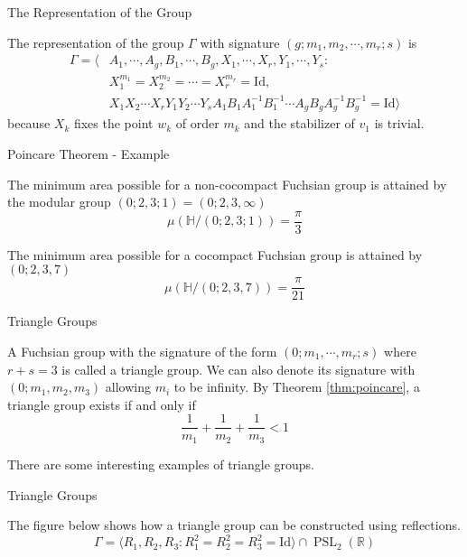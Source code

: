 \documentclass[
	american,
	sections numbered,
	usenames,
	xcolor=dvipsnames,
	aspectratio=169,
]{beamer}
\renewcommand{\H}{\mathbb{H}}
\DeclareMathOperator{\PSL}{PSL}
\theoremstyle{plain}%
\begin{document}
\begin{frame}{The Representation of the Group}

	The representation of the group $\Gamma$ with signature $(g;m_1,m_2,\cdots,m_r;s)$ is 
    \begin{align*}
    \Gamma=\langle &A_1,\cdots,A_g,B_1,\cdots,B_g,X_1,\cdots,X_r,Y_1,\cdots,Y_s:\\
    &X_1^{m_1}=X_2^{m_2}=\cdots=X_r^{m_r}=\text{Id},\\
    &X_1X_2\cdots X_rY_1Y_2\cdots Y_sA_1B_1A_1^{-1}B_1^{-1}\cdots A_gB_gA_g^{-1}B_g^{-1}=\text{Id}\rangle
    \end{align*}
    because $X_k$ fixes the point $w_k$ of order $m_k$ and the stabilizer of $v_1$ is trivial.

\end{frame}

\begin{frame}{Poincare Theorem - Example}

	The minimum area possible for a non-cocompact Fuchsian group is attained by the modular group $(0;2,3;1)=(0;2,3,\infty)$
    $$\mu(\H/(0;2,3;1))=\frac{\pi}{3}$$

    The minimum area possible for a cocompact Fuchsian group is attained by $(0;2,3,7)$
    $$\mu(\H/(0;2,3,7))=\frac{\pi}{21}$$

\end{frame}

\begin{frame}{Triangle Groups}

	A Fuchsian group with the signature of the form $(0;m_1,\cdots,m_r;s)$ where $r+s=3$ is called a triangle group. We can also denote its signature with $(0;m_1,m_2,m_3)$ allowing $m_i$ to be infinity. By Theorem \ref{thm:poincare}, a triangle group exists if and only if $$\frac{1}{m_1}+\frac{1}{m_2}+\frac{1}{m_3}<1$$

    There are some interesting examples of triangle groups.

\end{frame}

\begin{frame}{Triangle Groups}

	The figure below shows how a triangle group can be constructed using reflections.
    $$\Gamma=\langle R_1,R_2,R_3: R_1^2=R_2^2=R_3^2=\text{Id}\rangle\cap \PSL_2(\mathbb{R})$$

    \begin{center}
    \end{center}
    
\end{frame}
\end{document}
